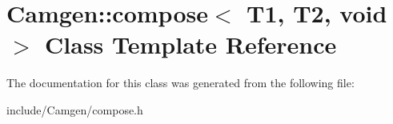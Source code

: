\hypertarget{a00096}{\section{Camgen\-:\-:compose$<$ T1, T2, void $>$ Class Template Reference}
\label{a00096}
}


The documentation for this class was generated from the following file\-:\begin{DoxyCompactItemize}
\item 
include/\-Camgen/compose.\-h\end{DoxyCompactItemize}
